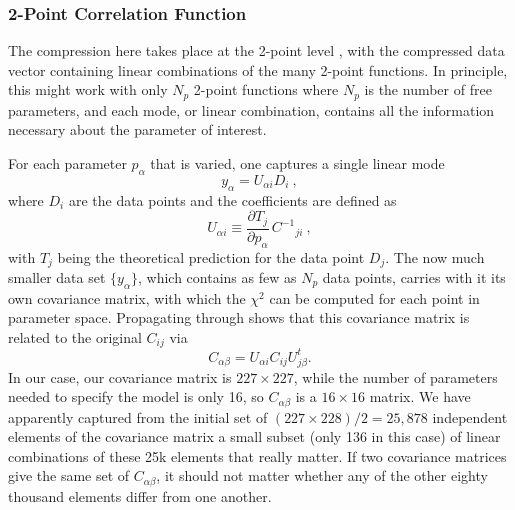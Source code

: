 \documentclass[twocolumn]{\docclass}
\newcommand\be{\begin{equation}}
\newcommand\ee{\end{equation}}
\def\bea{\begin{eqnarray}}
\def\eea{\end{eqnarray}}
\def\svs{\nonumber\\}
\begin{document}
	
	\subsubsection{2-Point Correlation Function}
	
	The compression here  takes place at the 2-point level \citep{Zablocki:2015zcm}, with the compressed data vector containing linear combinations of the many 2-point functions. In principle, this might work with only $N_p$ 2-point functions where $N_p$ is the number of free parameters, and each mode, or linear combination, contains all the information necessary about the parameter of interest. 
	
	For each parameter $p_\alpha$ that is varied, one captures a single linear mode
	\be
	y_\alpha = U_{\alpha i} D_i\
	,\ee
	where $D_i$ are the data points and the coefficients are defined as
	\be \label{eq:compression_scheme}
	U_{\alpha i} \equiv \frac{\partial T_j}{\partial p_\alpha} \, C^{-1}{}_{ji}\
	,\ee
	with $T_j$ being the theoretical prediction for the data point $D_j$.
	The now much smaller data set $\{y_\alpha\}$, which contains as few as $N_p$ data points, carries with it its own covariance matrix, with which the $\chi^2$ can be computed for each point in parameter space. Propagating through shows that this covariance matrix is related to the original $C_{ij}$ via
	\be
	C_{\alpha\beta} = U_{\alpha i} C_{ij} U^t_{j\beta}.
	\ee
	In our case, our covariance matrix is  $227 \times 227$, while the number of parameters needed to specify the model is only 16, so $C_{\alpha\beta}$ is a $16\times 16$ matrix. We have apparently captured from the initial set of $(227 \times 228)/2 = 25,878$ independent elements of the covariance matrix a small subset (only 136 in this case) of linear combinations of these 25k elements that really matter. If two covariance matrices give the same set of $C_{\alpha\beta}$, it should not matter whether any of the other eighty thousand elements differ from one another.
	
\end{document}
